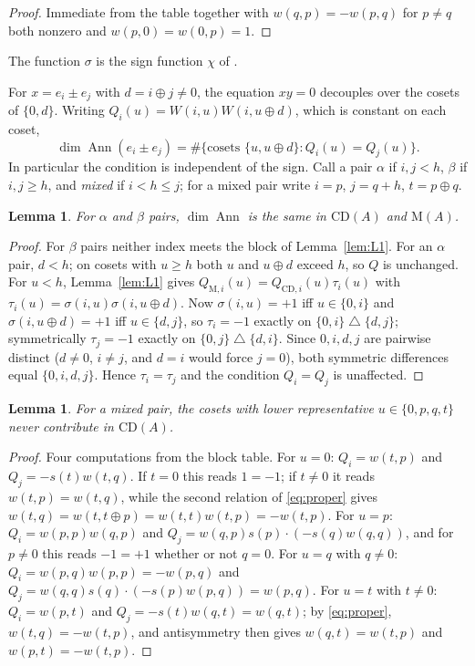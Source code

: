 \documentclass[11pt]{amsart}
\theoremstyle{plain}
\newtheorem{lemma}[theorem]{Lemma}
\theoremstyle{definition}
\newcommand{\CD}{\mathrm{CD}}
\newcommand{\MM}{\mathrm{M}}
\newcommand{\Ann}{\operatorname{Ann}}
\begin{document}
\begin{proof}
Immediate from the table together with $w(q,p)=-w(p,q)$ for $p\neq q$ both
nonzero and $w(p,0)=w(0,p)=1$.
\end{proof}

The function $\sigma$ is the sign function $\chi$ of \cite[\S7]{LuiI}.

For $x=e_i\pm e_j$ with $d=i\oplus j\neq 0$, the equation $xy=0$ decouples over
the cosets of $\{0,d\}$. Writing $Q_i(u)=W(i,u)W(i,u\oplus d)$, which is
constant on each coset,
\begin{equation}\label{eq:coset}
  \dim\Ann(e_i\pm e_j)=\#\{\text{cosets }\{u,u\oplus d\}: Q_i(u)=Q_j(u)\}.
\end{equation}
In particular the condition is independent of the sign. Call a pair
\emph{$\alpha$} if $i,j<h$, \emph{$\beta$} if $i,j\geq h$, and \emph{mixed} if
$i<h\leq j$; for a mixed pair write $i=p$, $j=q+h$, $t=p\oplus q$.

\begin{lemma}\label{lem:L2}
For $\alpha$ and $\beta$ pairs, $\dim\Ann$ is the same in $\CD(A)$ and $\MM(A)$.
\end{lemma}

\begin{proof}
For $\beta$ pairs neither index meets the block of Lemma~\ref{lem:L1}. For an
$\alpha$ pair, $d<h$; on cosets with $u\geq h$ both $u$ and $u\oplus d$ exceed
$h$, so $Q$ is unchanged. For $u<h$, Lemma~\ref{lem:L1} gives
$Q_{\MM,i}(u)=Q_{\CD,i}(u)\tau_i(u)$ with
$\tau_i(u)=\sigma(i,u)\sigma(i,u\oplus d)$. Now $\sigma(i,u)=+1$ iff
$u\in\{0,i\}$ and $\sigma(i,u\oplus d)=+1$ iff $u\in\{d,j\}$, so $\tau_i=-1$
exactly on $\{0,i\}\bigtriangleup\{d,j\}$; symmetrically $\tau_j=-1$ exactly on
$\{0,j\}\bigtriangleup\{d,i\}$. Since $0,i,d,j$ are pairwise distinct
($d\neq0$, $i\neq j$, and $d=i$ would force $j=0$), both symmetric differences
equal $\{0,i,d,j\}$. Hence $\tau_i=\tau_j$ and the condition $Q_i=Q_j$ is
unaffected.
\end{proof}

\begin{lemma}\label{lem:L3}
For a mixed pair, the cosets with lower representative $u\in\{0,p,q,t\}$ never
contribute in $\CD(A)$.
\end{lemma}

\begin{proof}
Four computations from the block table.
For $u=0$: $Q_i=w(t,p)$ and $Q_j=-s(t)w(t,q)$. If $t=0$ this reads $1=-1$; if
$t\neq0$ it reads $w(t,p)=w(t,q)$, while the second relation of
\eqref{eq:proper} gives $w(t,q)=w(t,t\oplus p)=w(t,t)w(t,p)=-w(t,p)$.
For $u=p$: $Q_i=w(p,p)w(q,p)$ and $Q_j=w(q,p)s(p)\cdot(-s(q)w(q,q))$, and for
$p\neq0$ this reads $-1=+1$ whether or not $q=0$.
For $u=q$ with $q\neq0$: $Q_i=w(p,q)w(p,p)=-w(p,q)$ and
$Q_j=w(q,q)s(q)\cdot(-s(p)w(p,q))=w(p,q)$.
For $u=t$ with $t\neq0$: $Q_i=w(p,t)$ and $Q_j=-s(t)w(q,t)=w(q,t)$; by
\eqref{eq:proper}, $w(t,q)=-w(t,p)$, and antisymmetry then gives
$w(q,t)=w(t,p)$ and $w(p,t)=-w(t,p)$.
\end{proof}
\end{document}
